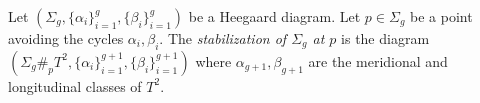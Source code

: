 

    Let $(\Sigma_g, \{\alpha_i\}_{i=1}^g, \{\beta_i\}_{i=1}^g)$ be a Heegaard diagram. Let $p\in \Sigma_g$ be a point avoiding the cycles $\alpha_i, \beta_i$. The \emph{stabilization of $\Sigma_g$ at $p$} is the diagram $(\Sigma_g \#_p T^2, \{\alpha_i\}_{i=1}^{g+1}, \{\beta_i\}_{i=1}^{g+1})$ where $\alpha_{g+1}, \beta_{g+1}$ are the meridional and longitudinal classes of $T^2$.

